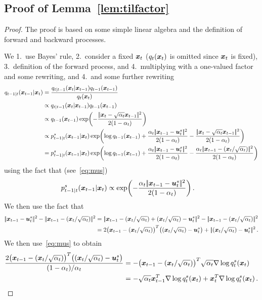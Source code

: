 \subsection{Proof of Lemma~\ref{lem:tilfactor}}\label{proof:tilf}
\begin{proof}
The proof is based on some simple linear algebra and the definition of forward and backward processes. 

We  1.~use Bayes' rule, 2.~consider a fixed $\textcolor{black}{\boldsymbol{x}}_t$ ($q_t(\textcolor{black}{\boldsymbol{x}}_t)$ is omitted since $\textcolor{black}{\boldsymbol{x}}_t$ is fixed), 3.~definition of the forward process, and 4.~multiplying with a one-valued factor and some rewriting, and 4.~and some further rewriting 
\begin{align*}
  \Fdd_{t-1|t}(\x_{t-1}|\x_t) &=\frac{\Fdd_{t|t-1}(\x_t|\x_{t-1})\Fdd_{t-1}(\x_{t-1})}{\Fdd_{t}(\x_t)} \\
  & \propto \Fdd_{t|t-1}(\x_t|\x_{t-1})\Fdd_{t-1}(\x_{t-1})\\
 & \propto \Fdd_{t-1}(\x_{t-1}) \exp \biggl(-\frac{\norm{\x_t-\sqrt{\alpha_t}\x_{t-1}}^2}{2(1-\alpha_t)}\biggr)\\
 & \propto \Bdds_{t-1|t}(\x_{t-1}|\x_t)  \exp \biggl(\log \Fdd_{t-1}(\x_{t-1})+\frac{\alpha_t\norm{\x_{t-1}-\us_t}^2}{2(1-\alpha_t)}-\frac{\norm{\x_t-\sqrt{\alpha_t}\x_{t-1}}^2}{2(1-\alpha_t)}\biggr)\\
 &=  \Bdds_{t-1|t}(\x_{t-1}|\x_t)  \exp \biggl(\log \Fdd_{t-1}(\x_{t-1})+\frac{\alpha_t\norm{\x_{t-1}-\us_t}^2}{2(1-\alpha_t)}-\frac{\alpha_t\norm{\x_{t-1}-(\x_{t}/\sqrt{\alpha_t})}^2}{2(1-\alpha_t)}\biggr)
\end{align*}
 using the fact that  (see~\eqref{eq:mus})
\begin{align*}
   p^s_{t-1|t}(\textcolor{black}{\boldsymbol{x}}_{t-1}|\textcolor{black}{\boldsymbol{x}}_t) & \propto \exp\biggl(-\frac{\alpha_t|\!|\textcolor{black}{\boldsymbol{x}}_{t-1}-\boldsymbol{u}^s_t|\!|^2}{2(1-\alpha_t)}\biggr)\,.
\end{align*}
We then use the fact that 
\begin{align*}
  \norm{\x_{t-1}-\us_t}^2-\norm{\x_{t-1}-(\x_{t}/\sqrt{\alpha_t})}^2&=\norm{\x_{t-1}-(\x_{t}/\sqrt{\alpha_t})+(\x_{t}/\sqrt{\alpha_t})-\us_t}^2-\norm{\x_{t-1}-(\x_{t}/\sqrt{\alpha_t})}^2\\
  &=2\bigl(\x_{t-1}-(\x_{t}/\sqrt{\alpha_t})\bigr)^T\bigl((\x_{t}/\sqrt{\alpha_t})-\us_t\bigr)+\norm{(\x_{t}/\sqrt{\alpha_t})-\us_t}^2\,.
\end{align*}
We then use~\eqref{eq:mus} to obtain 
\begin{align*}
 \frac{2\bigl(\textcolor{black}{\boldsymbol{x}}_{t-1}-(\textcolor{black}{\boldsymbol{x}}_{t}/\sqrt{\alpha_t})\bigr)^T\bigl((\textcolor{black}{\boldsymbol{x}}_{t}/\sqrt{\alpha_t})-\boldsymbol{u}^s_t\bigr)}{(1-\alpha_t)/\alpha_t}  & =-\bigl(\textcolor{black}{\boldsymbol{x}}_{t-1}-(\textcolor{black}{\boldsymbol{x}}_{t}/\sqrt{\alpha_t})\bigr)^T \sqrt{\alpha_t} \nabla\log q^s_t(\textcolor{black}{\boldsymbol{x}}_t)\\
 &=-\sqrt{\alpha_t}\textcolor{black}{\boldsymbol{x}}_{t-1}^T\nabla\log q^s_t(\textcolor{black}{\boldsymbol{x}}_t)+\textcolor{black}{\boldsymbol{x}}_t^T\nabla\log q^s_t(\textcolor{black}{\boldsymbol{x}}_t)\,.
\end{align*}
    

\end{proof}
